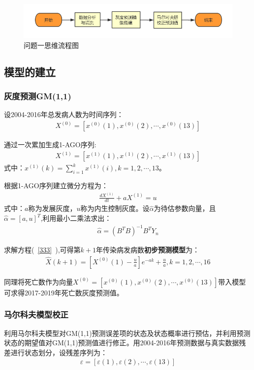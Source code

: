 \documentclass{whutmod}
\begin{document}
       \begin{figure}[H]
   	\centering
   	\includegraphics[width=\textwidth]{figures/lctc.png}
   	\caption{问题一思维流程图}\label{lct}
   \end{figure}

   
	    \subsection{模型的建立}
	    \subsubsection{灰度预测GM(1,1)}
	    设2004-2016年总发病人数为时间序列：
	     \begin{gather*}
	    X^{(0)}=[x^{(0)}(1),x^{(0)}(2),\cdots,x^{(0)}(13)]
	    \end{gather*}
	    
	    通过一次累加生成1-AGO序列:
	    \begin{gather*}
	    X^{(1)}=[x^{(1)}(1),x^{(1)}(2),\cdots,x^{(1)}(13)]
	    \end{gather*}
	    式中：$x^{(1)}(k)=\sum_{i=1}^{k}x^{(1)}(i),k=1,2,\cdots,13$。
	    
	    根据1-AGO序列建立微分方程为\cite{bib:one}：
	     \begin{gather}\label{333}
	    \frac{d X^{(1)}}{dt}+a X^{(1)} = u
	     \end{gather}
	     式中：$a$称为发展灰度，$u$称为内生控制灰度。设$\widehat{\alpha }$为待估参数向量，且$\widehat{\alpha }=[a,u]^T$,利用最小二乘法求出：
	     \begin{gather}
	     \widehat{\alpha }=(B^TB)^{-1}B^{T}Y_{n}
	     \end{gather}
	     
	     求解方程(~\ref{333}~),可得第$k+1$年传染病发病数\textbf{初步预测模型}为：
	     \begin{gather}
	     \widehat{X}(k+1)=[X^{(0)}(1)-\frac{u}{a}]e^{-ak}+\frac{u}{a},k=1,2,\cdots,16
	     \end{gather}
	     
	     同理将死亡数作为向量$X^{(0)}=[x^{(0)}(1),x^{(0)}(2),\cdots,x^{(0)}(13)]$带入模型可求得2017-2019年死亡数灰度预测值。
	     \subsubsection{马尔科夫模型校正}
	     利用马尔科夫模型对GM(1,1)预测误差项的状态及状态概率进行预估，并利用预测状态的期望值对GM(1,1)预测值进行修正\cite{bib:2}。用2004-2016年预测数据与真实数据残差进行状态划分，设残差序列为：
	     \begin{gather*}
	    \varepsilon =[\varepsilon(1) ,\varepsilon(2), \cdots,\varepsilon(13)]
	     \end{gather*}
	     
\end{document}
